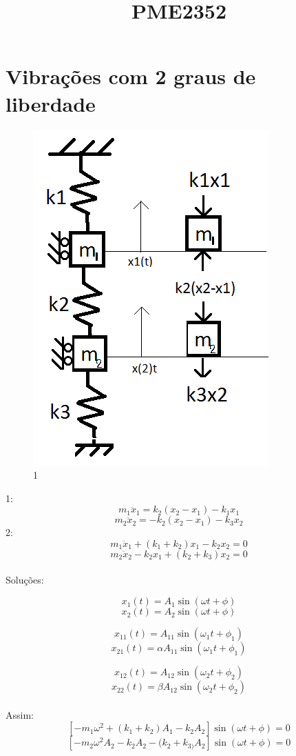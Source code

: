 \documentclass[a4paper, 12pt]{article}
\title{PME2352}
\begin{document}
\maketitle

\section{Vibrações com 2 graus de liberdade}
\begin{figure}[h]
\begin{center}
\includegraphics[scale=0.78]{./fig/1.png}
\caption{\label{fig:1}1} 
\end{center}
\end{figure}

1:
\[m_{1}\ddot{x}_{1}=k_{2}(x_{2}-x_{1})-k_{1}x_{1}\]
\[m_{2}\ddot{x}_{2}=-k_{2}(x_{2}-x_{1})-k_{3}x_{2}\]
2:
\[m_{1}\ddot{x}_{1}+(k_{1}+k_{2})x_{1}-k_{2}x_{2}=0\]
\[m_{2}\ddot{x}_{2}-k_{2}x_{1}+(k_{2}+k_{3})x_{2}=0\]
\\
Soluções:

\[x_{1}(t)=A_{1}\sin(\omega t + \phi)\]
\[x_{2}(t)=A_{2}\sin(\omega t + \phi)\]

\[x_{11}(t)=A_{11}\sin(\omega_{1} t + \phi _{1})\]
\[x_{21}(t)=\alpha A_{11}\sin(\omega_{1} t + \phi _{1})\]

\[x_{12}(t)=A_{12}\sin(\omega_{2} t + \phi _{2})\]
\[x_{22}(t)=\beta A_{12}\sin(\omega_{2} t + \phi _{2})\]
\\
Assim:
\[[-m_{1}\omega^{2}+(k_{1}+k_{2})A_{1}-k_{2}A_{2}]\sin(\omega t + \phi)=0\]
\[[-m_{2}\omega^{2}A_{2}-k_{2}A_{2}-(k_{2}+k_{3)}A_{2}]\sin(\omega t + \phi)=0\]
\end{document}
